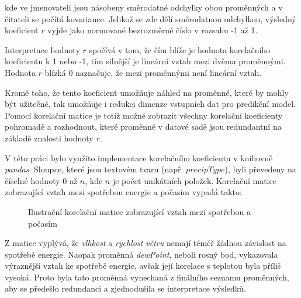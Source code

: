\documentclass[FM,BP,fonts]{tulthesis}
\begin{document}
kde ve jmenovateli jsou násobeny směrodatné odchylky obou proměnných a v čitateli se počítá kovariance. Jelikož se zde dělí směrodatnou odchylkou, výsledný koeficient $r$ vyjde jako normované bezrozměrné číslo v rozsahu -1 až 1.

Interpretace hodnoty $r$ spočívá v tom, že čím blíže je hodnota korelačního koeficientu k 1 nebo -1, tím silnější je lineární vztah mezi dvěma proměnnými. Hodnota $r$ blízká 0 naznačuje, že mezi proměnnými není lineární vztah.

Kromě toho, že tento koeficient umožňuje náhled na proměnné, které by mohly být užitečné, tak umožňuje i redukci dimenze vstupních dat pro predikční model. Pomocí korelační matice je totiž možné zobrazit všechny korelační koeficienty pohromadě a rozhodnout, které proměnné v datové sadě jsou redundantní na základě znalosti hodnoty $r$.

V této práci bylo využito implementace korelačního koeficientu v knihovně \textit{pandas}. Sloupce, které jsou textovém tvaru (např. $precipType$), byli převedeny na číselné hodnoty 0 až $n$, kde $n$ je počet unikátních položek. Korelační matice zobrazující vztah mezi spotřebou energie a počasím vypadá takto:

\begin{figure}[htbp]
	\centering
	\caption{Ilustrační korelační matice zobrazující vztah mezi spotřebou a počasím}
	\label{fig:year_avg_all}
\end{figure}

Z matice vyplývá, že \textit{vlhkost} a \textit{rychlost větru} nemají téměř žádnou závislost na spotřebě energie. Naopak proměnná \textit{dewPoint}, neboli rosný bod, vykazovala výraznější vztah ke spotřebě energie, avšak její korelace s teplotou byla příliš vysoká. Proto byla tato proměnná vynechaná z finálního seznamu proměnných, aby se předešlo redundanci a zjednodušila se interpretace výsledků.
\end{document}

